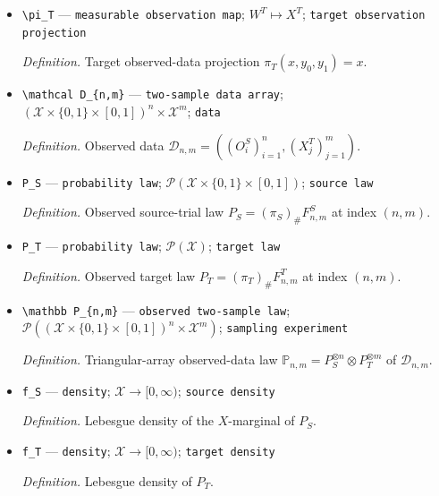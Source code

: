 \documentclass{article}
\begin{document}
\begin{itemize}
  \par\smallskip\noindent\emph{Definition.} Source observed-data projection \(\pi_S(x,d,y_0,y_1)=(x,d,y_d)\).
  \item \texttt{\textbackslash{}\allowbreak{}pi\_\allowbreak{}T} --- \texttt{measurable observation map}; \(W^T\mapsto X^T\); \texttt{target observation projection}
  \par\smallskip\noindent\emph{Definition.} Target observed-data projection \(\pi_T(x,y_0,y_1)=x\).
  \item \texttt{\textbackslash{}\allowbreak{}mathcal D\_\allowbreak{}\{n,\allowbreak{}m\}\allowbreak{}} --- \texttt{two-\allowbreak{}sample data array}; \((\mathcal X\times\{0,1\}\times[0,1])^n\times\mathcal X^m\); \texttt{data}
  \par\smallskip\noindent\emph{Definition.} Observed data \(\mathcal D_{n,m}=((O_i^S)_{i=1}^n,(X_j^T)_{j=1}^m)\).
  \item \texttt{P\_\allowbreak{}S} --- \texttt{probability law}; \(\mathcal P(\mathcal X\times\{0,1\}\times[0,1])\); \texttt{source law}
  \par\smallskip\noindent\emph{Definition.} Observed source-trial law \(P_S=(\pi_S)_\#F^S_{n,m}\) at index \((n,m)\).
  \item \texttt{P\_\allowbreak{}T} --- \texttt{probability law}; \(\mathcal P(\mathcal X)\); \texttt{target law}
  \par\smallskip\noindent\emph{Definition.} Observed target law \(P_T=(\pi_T)_\#F^T_{n,m}\) at index \((n,m)\).
  \item \texttt{\textbackslash{}\allowbreak{}mathbb P\_\allowbreak{}\{n,\allowbreak{}m\}\allowbreak{}} --- \texttt{observed two-\allowbreak{}sample law}; \(\mathcal P((\mathcal X\times\{0,1\}\times[0,1])^n\times\mathcal X^m)\); \texttt{sampling experiment}
  \par\smallskip\noindent\emph{Definition.} Triangular-array observed-data law \(\mathbb P_{n,m}=P_S^{\otimes n}\otimes P_T^{\otimes m}\) of \(\mathcal D_{n,m}\).
  \item \texttt{f\_\allowbreak{}S} --- \texttt{density}; \(\mathcal X\to[0,\infty)\); \texttt{source density}
  \par\smallskip\noindent\emph{Definition.} Lebesgue density of the \(X\)-marginal of \(P_S\).
  \item \texttt{f\_\allowbreak{}T} --- \texttt{density}; \(\mathcal X\to[0,\infty)\); \texttt{target density}
  \par\smallskip\noindent\emph{Definition.} Lebesgue density of \(P_T\).

\end{itemize}
\end{document}
